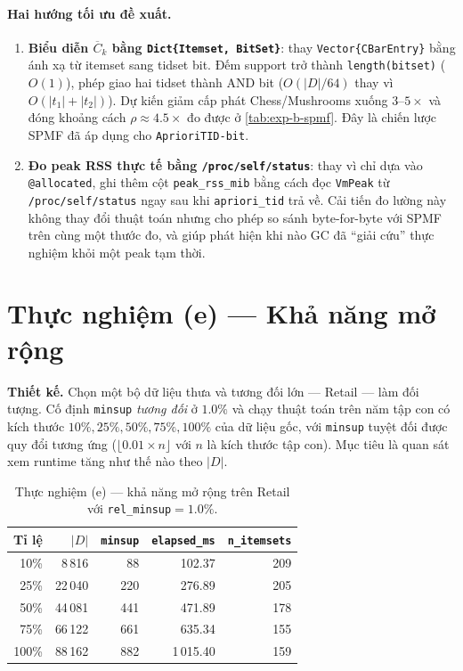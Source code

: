 \paragraph{Hai hướng tối ưu đề xuất.}
\begin{enumerate}
    \item \textbf{Biểu diễn $\overline{C}_k$ bằng \texttt{Dict\{Itemset, BitSet\}}}: thay \texttt{Vector\{CBarEntry\}} bằng ánh xạ từ itemset sang tidset bit. Đếm support trở thành \texttt{length(bitset)} ($O(1)$), phép giao hai tidset thành AND bit ($O(|D|/64)$ thay vì $O(|t_1| + |t_2|)$). Dự kiến giảm cấp phát Chess/Mushrooms xuống $3$--$5\times$ và đóng khoảng cách $\rho \approx 4.5\times$ đo được ở \autoref{tab:exp-b-spmf}. Đây là chiến lược SPMF đã áp dụng cho \texttt{AprioriTID-bit}.
    \item \textbf{Đo peak RSS thực tế bằng \texttt{/proc/self/status}}: thay vì chỉ dựa vào \texttt{@allocated}, ghi thêm cột \texttt{peak\_rss\_mib} bằng cách đọc \texttt{VmPeak} từ \texttt{/proc/self/status} ngay sau khi \texttt{apriori\_tid} trả về. Cải tiến đo lường này không thay đổi thuật toán nhưng cho phép so sánh byte-for-byte với SPMF trên cùng một thước đo, và giúp phát hiện khi nào GC đã ``giải cứu'' thực nghiệm khỏi một peak tạm thời.
\end{enumerate}

\section{Thực nghiệm (e) --- Khả năng mở rộng}
\label{sec:exp-e}

\textbf{Thiết kế.} Chọn một bộ dữ liệu thưa và tương đối lớn --- Retail --- làm đối tượng. Cố định \texttt{minsup} \emph{tương đối} ở $1.0\%$ và chạy thuật toán trên năm tập con có kích thước $10\%, 25\%, 50\%, 75\%, 100\%$ của dữ liệu gốc, với \texttt{minsup} tuyệt đối được quy đổi tương ứng ($\lfloor 0.01 \times n\rfloor$ với $n$ là kích thước tập con). Mục tiêu là quan sát xem runtime tăng như thế nào theo $|D|$.

\begin{table}[htbp]
    \centering
    \caption{Thực nghiệm (e) --- khả năng mở rộng trên Retail với \texttt{rel\_minsup}$= 1.0\%$.}
    \label{tab:exp-e}
    \begin{tabular}{r|r|r|r|r}
        \hline
        \textbf{Tỉ lệ} & $|D|$ & \texttt{minsup} & \texttt{elapsed\_ms} & \texttt{n\_itemsets} \\ \hline
        10\%  & 8\,816  & 88  & 102.37    & 209 \\
        25\%  & 22\,040 & 220 & 276.89    & 205 \\
        50\%  & 44\,081 & 441 & 471.89    & 178 \\
        75\%  & 66\,122 & 661 & 635.34    & 155 \\
        100\% & 88\,162 & 882 & 1\,015.40 & 159 \\
        \hline
    \end{tabular}
\end{table}

